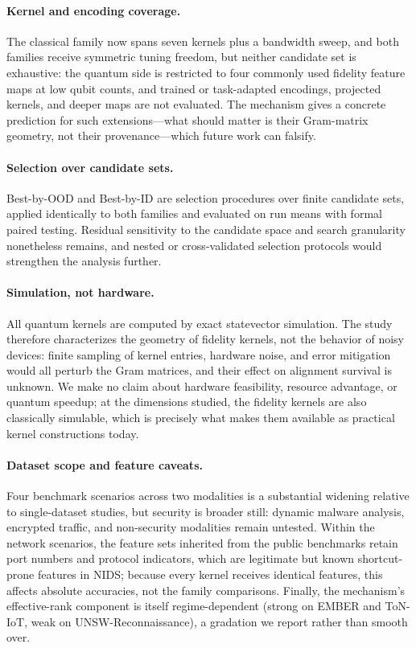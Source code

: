 \documentclass[journal]{IEEEtran}
\begin{document}
\paragraph{Kernel and encoding coverage.}
The classical family now spans seven kernels plus a bandwidth sweep, and both families receive symmetric tuning freedom, but neither candidate set is exhaustive: the quantum side is restricted to four commonly used fidelity feature maps at low qubit counts, and trained or task-adapted encodings, projected kernels, and deeper maps are not evaluated. The mechanism gives a concrete prediction for such extensions---what should matter is their Gram-matrix geometry, not their provenance---which future work can falsify.

\paragraph{Selection over candidate sets.}
Best-by-OOD and Best-by-ID are selection procedures over finite candidate sets, applied identically to both families and evaluated on run means with formal paired testing. Residual sensitivity to the candidate space and search granularity nonetheless remains, and nested or cross-validated selection protocols would strengthen the analysis further.

\paragraph{Simulation, not hardware.}
All quantum kernels are computed by exact statevector simulation. The study therefore characterizes the geometry of fidelity kernels, not the behavior of noisy devices: finite sampling of kernel entries, hardware noise, and error mitigation would all perturb the Gram matrices, and their effect on alignment survival is unknown. We make no claim about hardware feasibility, resource advantage, or quantum speedup; at the dimensions studied, the fidelity kernels are also classically simulable, which is precisely what makes them available as practical kernel constructions today.

\paragraph{Dataset scope and feature caveats.}
Four benchmark scenarios across two modalities is a substantial widening relative to single-dataset studies, but security is broader still: dynamic malware analysis, encrypted traffic, and non-security modalities remain untested. Within the network scenarios, the feature sets inherited from the public benchmarks retain port numbers and protocol indicators, which are legitimate but known shortcut-prone features in NIDS; because every kernel receives identical features, this affects absolute accuracies, not the family comparisons. Finally, the mechanism's effective-rank component is itself regime-dependent (strong on EMBER and ToN-IoT, weak on UNSW-Reconnaissance), a gradation we report rather than smooth over.
\end{document}
